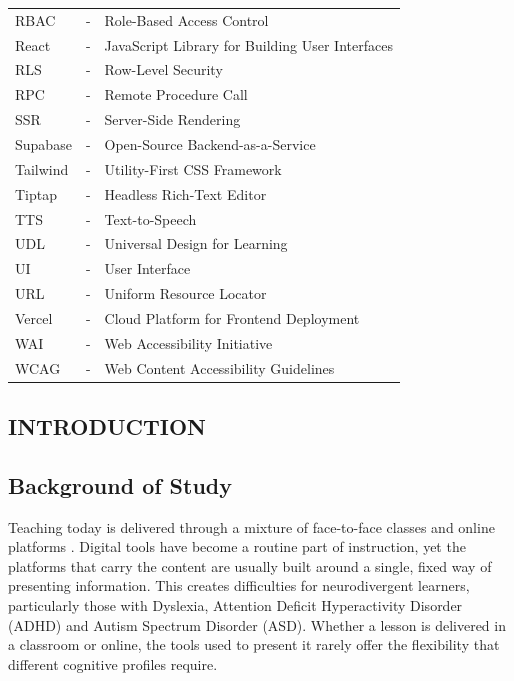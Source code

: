 \documentclass[12pt, oneside]{article} %
\newcommand{\tabbreak}{\hyphenpenalty=200\exhyphenpenalty=200\tolerance=4000\hbadness=10000\hspace{0pt}}
\begin{document}
\begin{tabular}{>{\raggedright\arraybackslash\tabbreak}p{2.27cm} >{\centering\arraybackslash\tabbreak}m{0.45cm} >{\raggedright\arraybackslash\tabbreak}p{11.0cm}}
RBAC & - & Role-Based Access Control \\
React & - & JavaScript Library for Building User Interfaces \\
RLS & - & Row-Level Security \\
RPC & - & Remote Procedure Call \\
SSR & - & Server-Side Rendering \\
Supabase & - & Open-Source Backend-as-a-Service \\
Tailwind & - & Utility-First CSS Framework \\
Tiptap & - & Headless Rich-Text Editor \\
TTS & - & Text-to-Speech \\
UDL & - & Universal Design for Learning \\
UI & - & User Interface \\
URL & - & Uniform Resource Locator \\
Vercel & - & Cloud Platform for Frontend Deployment \\
WAI & - & Web Accessibility Initiative \\
WCAG & - & Web Content Accessibility Guidelines \\
\end{tabular}

\vfill \null
\newpage


\clearpage
{}
\setcounter{page}{1}

\setlength{\parindent}{30pt}



\newpage
\vfill \null
\thispagestyle{empty}
\begin{center}
\section{INTRODUCTION}
\end{center}
\vspace{2cm}

\subsection{Background of Study}

Teaching today is delivered through a mixture of face-to-face classes and online platforms \cite{prensky2001digital}. Digital tools have become a routine part of instruction, yet the platforms that carry the content are usually built around a single, fixed way of presenting information. This creates difficulties for neurodivergent learners, particularly those with Dyslexia, Attention Deficit Hyperactivity Disorder (ADHD) and Autism Spectrum Disorder (ASD). Whether a lesson is delivered in a classroom or online, the tools used to present it rarely offer the flexibility that different cognitive profiles require.
\end{document}
